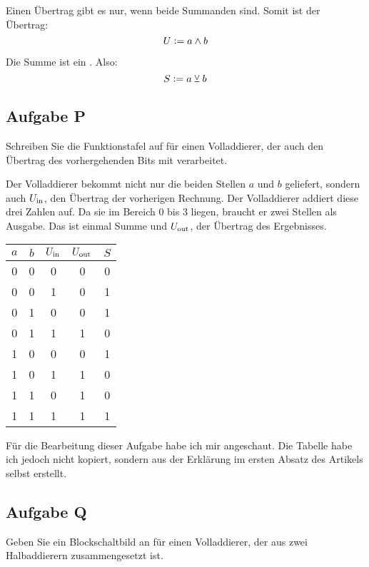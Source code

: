 Einen Übertrag gibt es nur, wenn beide Summanden \thigh{} sind. Somit ist der
Übertrag:
\[
	U := a \wedge b
\]

Die Summe ist ein \txor. Also:
\[
	S := a \veebar b
\]

\FloatBarrier
\subsection{Aufgabe P}

\begin{problem}
	Schreiben Sie die Funktionstafel auf für einen Volladdierer, der auch den
	Übertrag des vorhergehenden Bits mit verarbeitet.
\end{problem}

Der Volladdierer bekommt nicht nur die beiden Stellen $a$ und $b$ geliefert,
sondern auch $U_\text{in}$, den Übertrag der vorherigen Rechnung. Der Volladdierer
addiert diese drei Zahlen auf. Da sie im Bereich 0 bis 3 liegen, braucht er
zwei Stellen als Ausgabe. Das ist einmal Summe und $U_\text{out}$, der Übertrag des
Ergebnisses.

\begin{tabular}{ccc|cc}
	$a$ & $b$ & $U_\text{in}$ & $U_\text{out}$ & $S$ \\
	\hline
	0 & 0 & 0 & 0 & 0 \\
	0 & 0 & 1 & 0 & 1 \\
	0 & 1 & 0 & 0 & 1 \\
	0 & 1 & 1 & 1 & 0 \\
	1 & 0 & 0 & 0 & 1 \\
	1 & 0 & 1 & 1 & 0 \\
	1 & 1 & 0 & 1 & 0 \\
	1 & 1 & 1 & 1 & 1 \\
\end{tabular}

\begin{small}
	Für die Bearbeitung dieser Aufgabe habe ich mir
	\cite{wikipedia/Volladdierer} angeschaut. Die Tabelle habe ich jedoch nicht
	kopiert, sondern aus der Erklärung im ersten Absatz des Artikels selbst
	erstellt.
\end{small}

\FloatBarrier
\subsection{Aufgabe Q}

\begin{problem}
	Geben Sie ein Blockschaltbild an für einen Volladdierer, der aus zwei
	Halbaddierern zusammengesetzt ist.
\end{problem}

